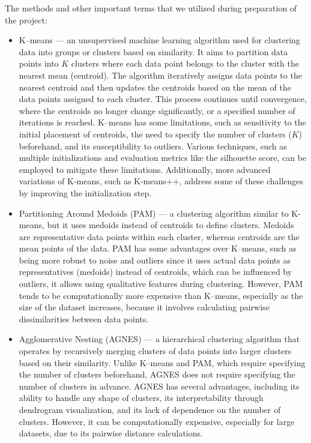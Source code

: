 \documentclass[11pt,a4paper]{article}\usepackage[]{graphicx}\usepackage[]{xcolor}
\begin{document}
	
	The methods and other important terms that we utilized during preparation of the project:
	\begin{itemize}
	
\item K--means --- an unsupervised machine learning algorithm used for clustering data into groups or clusters based on similarity. It aims to partition data points into $K$ clusters where each data point belongs to the cluster with the nearest mean (centroid). The algorithm iteratively assigns data points to the nearest centroid and then updates the centroids based on the mean of the data points assigned to each cluster. This process continues until convergence, where the centroids no longer change significantly, or a specified number of iterations is reached. K--means has some limitations, such as sensitivity to the initial placement of centroids, the need to specify the number of clusters ($K$) beforehand, and its susceptibility to outliers. Various techniques, such as multiple initializations and evaluation metrics like the silhouette score, can be employed to mitigate these limitations. Additionally, more advanced variations of K-means, such as K-means++, address some of these challenges by improving the initialization step.

\item Partitioning Around Medoids (PAM) --- a clustering algorithm similar to K-means, but it uses medoids instead of centroids to define clusters. Medoids are representative data points within each cluster, whereas centroids are the mean points of the data. PAM has some advantages over K--means, such as being more robust to noise and outliers since it uses actual data points as representatives (medoids) instead of centroids, which can be influenced by outliers, it allows using qualitative features during clustering. However, PAM tends to be computationally more expensive than K--means, especially as the size of the dataset increases, because it involves calculating pairwise dissimilarities between data points.

\item Agglomerative Nesting (AGNES) --- a hierarchical clustering algorithm that operates by recursively merging clusters of data points into larger clusters based on their similarity. Unlike K--means and PAM, which require specifying the number of clusters beforehand, AGNES does not require specifying the number of clusters in advance. AGNES has several advantages, including its ability to handle any shape of clusters, its interpretability through dendrogram visualization, and its lack of dependence on the number of clusters. However, it can be computationally expensive, especially for large datasets, due to its pairwise distance calculations.


\end{itemize}
\end{document}
